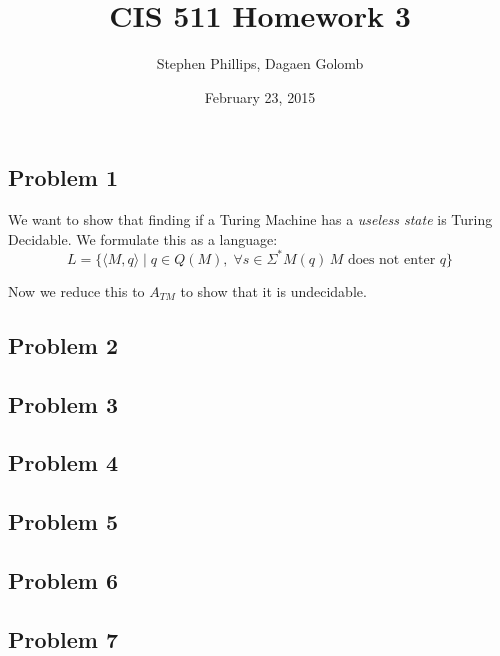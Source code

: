\documentclass[english]{article}
\title{CIS 511 Homework 3}
\author{Stephen Phillips, Dagaen Golomb}
\date{February 23, 2015}
\begin{document}
\maketitle
\subsection*{Problem 1}
We want to show that finding if a Turing Machine has a \textit{useless state}
is Turing Decidable. We formulate this as a language:
\[ L = \{ \langle M, q \rangle \mid
   q \in Q(M), \;
   \forall s \in \Sigma^* M(q) \, M\textrm{ does not enter }q \} \]

Now we reduce this to $A_{TM}$ to show that it is undecidable.



\subsection*{Problem 2}
\subsection*{Problem 3}
\subsection*{Problem 4}
\subsection*{Problem 5}
\subsection*{Problem 6}
\subsection*{Problem 7}
\end{document}
